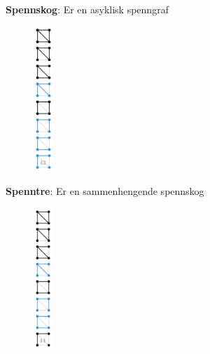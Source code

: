 \documentclass[12pt]{report}
\begin{document}

\par

\textbf{Spennskog}: Er en asyklisk spenngraf\par




\begin{figure}[H]
	\begin{Center}
		\includegraphics[width=0.29in,height=2.15in]{./media/image111.png}
	\end{Center}
\end{figure}



\par

\textbf{Spenntre}: Er en sammenhengende spennskog\par




\begin{figure}[H]
	\begin{Center}
		\includegraphics[width=0.28in,height=2.1in]{./media/image112.png}
	\end{Center}
\end{figure}
\end{document}
